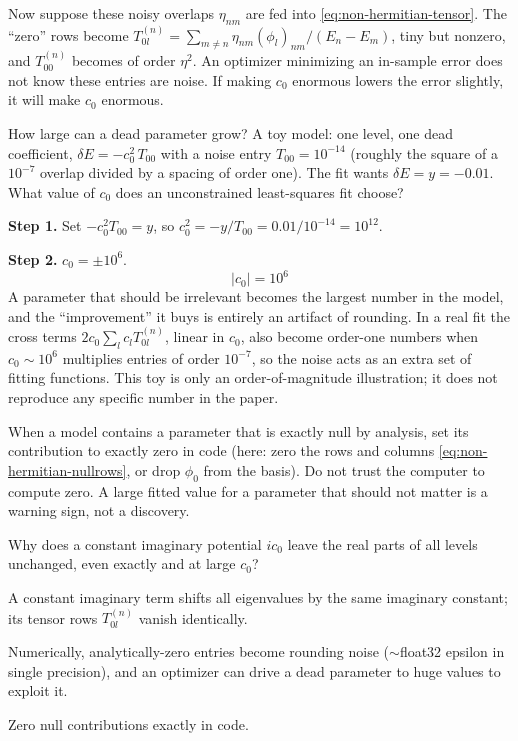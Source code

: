 Now suppose these noisy overlaps $\eta_{nm}$ are fed into \eqref{eq:non-hermitian-tensor}. The ``zero'' rows become $T^{(n)}_{0l}=\sum_{m\ne n}\eta_{nm}(\phi_l)_{nm}/(E_n-E_m)$, tiny but nonzero, and $T^{(n)}_{00}$ becomes of order $\eta^2$. An optimizer minimizing an in-sample error does not know these entries are noise. If making $c_0$ enormous lowers the error slightly, it will make $c_0$ enormous.

\begin{sample}{How large can a dead parameter grow?}
A toy model: one level, one dead coefficient, $\delta E = -c_0^2\,T_{00}$ with a noise entry $T_{00}=10^{-14}$ (roughly the square of a $10^{-7}$ overlap divided by a spacing of order one). The fit wants $\delta E=y=-0.01$. What value of $c_0$ does an unconstrained least-squares fit choose?

\textbf{Step 1.} Set $-c_0^2T_{00}=y$, so $c_0^2=-y/T_{00}=0.01/10^{-14}=10^{12}$.

\textbf{Step 2.} $c_0=\pm10^6$.
\[
\boxed{|c_0| = 10^6}
\]
A parameter that should be irrelevant becomes the largest number in the model, and the ``improvement'' it buys is entirely an artifact of rounding. In a real fit the cross terms $2c_0\sum_lc_lT^{(n)}_{0l}$, linear in $c_0$, also become order-one numbers when $c_0\sim10^6$ multiplies entries of order $10^{-7}$, so the noise acts as an extra set of fitting functions. This toy is only an order-of-magnitude illustration; it does not reproduce any specific number in the paper.
\end{sample}

\begin{pitfall}
When a model contains a parameter that is exactly null by analysis, set its contribution to exactly zero in code (here: zero the rows and columns \eqref{eq:non-hermitian-nullrows}, or drop $\phi_0$ from the basis). Do not trust the computer to compute zero. A large fitted value for a parameter that should not matter is a warning sign, not a discovery.
\end{pitfall}

\begin{checkpoint}
Why does a constant imaginary potential $ic_0$ leave the real parts of all levels unchanged, even exactly and at large $c_0$?
\end{checkpoint}

\begin{keyideas}
\item A constant imaginary term shifts all eigenvalues by the same imaginary constant; its tensor rows $T^{(n)}_{0l}$ vanish identically.
\item Numerically, analytically-zero entries become rounding noise ($\sim$float32 epsilon in single precision), and an optimizer can drive a dead parameter to huge values to exploit it.
\item Zero null contributions exactly in code.
\end{keyideas}

